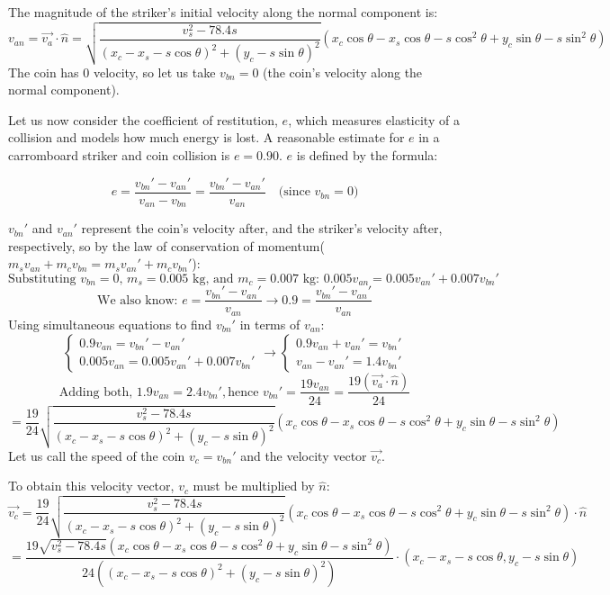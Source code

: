 \documentclass[10pt]{article}
\begin{document}
The magnitude of the striker's initial velocity along the normal component is:
\[
v_{an} = \vec{v_a} \cdot \hat{n} = \sqrt{\frac{v_s^2 - 78.4s}{(x_c - x_s - s \cos \theta)^2 + (y_c - s\sin\theta)^2}} \left(x_c\cos\theta - x_s\cos\theta - s \cos^2 \theta + y_c\sin\theta - s\sin^2\theta\right)\]
The coin has 0 velocity, so let us take $v_{bn} = 0$ (the coin's velocity along the normal component).

Let us now consider the coefficient of restitution, $e$, which measures elasticity of a collision and models how much energy is lost. A reasonable estimate for $e$ in a carromboard striker and coin collision is $e = 0.90$. $e$ is defined by the formula:

\[
e = \frac{v_{bn}' - v_{an}'}{v_{an} - v_{bn}} = \frac{v_{bn}' - v_{an}'}{v_{an}} \quad \text{(since } v_{bn} = 0 \text{)}
\]

$v_{bn}'$ and $v_{an}'$ represent the coin's velocity after, and the striker's velocity after, respectively, so by the law of conservation of momentum($m_s v_{an} + m_cv_{bn} = m_sv_{an}' + m_c v_{bn}'$):
\[
\text{Substituting $v_{bn} = 0$, $m_s = 0.005$ kg, and $m_c = 0.007$ kg: }0.005v_{an} = 0.005v_{an}' + 0.007v_{bn}'
\]
\[
\text{We also know: } e = \frac{v_{bn}' - v_{an}'}{v_{an}} \rightarrow 0.9 = \frac{v_{bn}' - v_{an}'}{v_{an}}
\]
Using simultaneous equations to find $v_{bn}'$ in terms of $v_{an}$:
\[
\begin{cases}
    0.9v_{an} = v_{bn}' - v_{an}' \\
    0.005v_{an} = 0.005v_{an}' + 0.007v_{bn}'
\end{cases}
\rightarrow
\begin{cases}
    0.9v_{an} + v_{an}' = v_{bn}'  \\
    v_{an} - v_{an}' =  1.4v_{bn}'
\end{cases}
\]
\[
\text{Adding both, }   1.9v_{an} = 2.4v_{bn}', \text{hence } v_{bn}' = \frac{19v_{an}}{24} = \frac{19(\vec{v_a} \cdot \hat{n})}{24}
\]
\[
= \frac{19}{24} \sqrt{\frac{v_s^2 - 78.4s}{(x_c - x_s - s \cos \theta)^2 + (y_c - s\sin\theta)^2}} \left(x_c\cos\theta - x_s\cos\theta - s \cos^2 \theta + y_c\sin\theta - s\sin^2\theta\right)
\]
Let us call the speed of the coin $v_c = v_{bn}'$ and the velocity vector $\vec{v_c}$.

To obtain this velocity vector, $v_c$ must be multiplied by $\hat{n}$:
\[
\vec{v_c} = \frac{19}{24} \sqrt{\frac{v_s^2 - 78.4s}{(x_c - x_s - s \cos \theta)^2 + (y_c - s\sin\theta)^2}} \left(x_c\cos\theta - x_s\cos\theta - s \cos^2 \theta + y_c\sin\theta - s\sin^2\theta\right) \cdot \hat{n}
\]
\[
= \frac{19\sqrt{v_s^2 - 78.4s} \left(x_c\cos\theta - x_s\cos\theta - s \cos^2 \theta + y_c\sin\theta - s\sin^2\theta\right)}{24((x_c - x_s - s \cos \theta)^2 + (y_c - s\sin\theta)^2)}  \cdot (x_c - x_s - s \cos \theta, y_c - s\sin\theta)
\]
\end{document}
